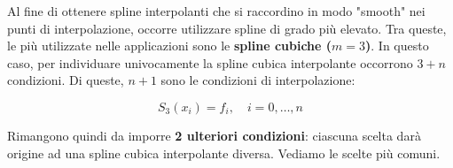 Al fine di ottenere spline interpolanti che si raccordino in modo "smooth" nei punti di interpolazione, occorre utilizzare spline di grado più elevato. Tra queste, le più utilizzate nelle applicazioni sono le \textbf{spline cubiche ($m=3$)}.
In questo caso, per individuare univocamente la spline cubica interpolante occorrono $3+n$ condizioni. Di queste, $n+1$ sono le condizioni di interpolazione:

\begin{equation} \label{eq:cond_interp_cubica}
    S_3(x_i) = f_i, \quad i=0, \dots, n
\end{equation}


Rimangono quindi da imporre \textbf{2 ulteriori condizioni}: ciascuna scelta darà origine ad una spline cubica interpolante diversa. Vediamo le scelte più comuni.


